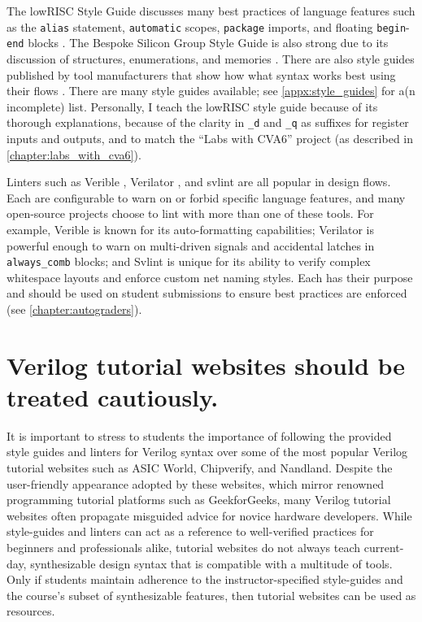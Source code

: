 The lowRISC Style Guide discusses many best practices of language features such as the \texttt{alias} statement, \texttt{automatic} scopes, \texttt{package} imports, and floating \texttt{begin}-\texttt{end} blocks \cite{lowRISCstyleguides}.
The Bespoke Silicon Group Style Guide is also strong due to its discussion of structures, enumerations, and memories \cite{BSGstyleguide}.
There are also style guides published by tool manufacturers that show how what syntax works best using their flows \cite{Xilinxstyleguide, Intelstyleguide, Latticestyleguide}.
There are many style guides available; see \autoref{appx:style_guides} for a(n incomplete) list.
Personally, I teach the lowRISC style guide because of its thorough explanations, because of the clarity in \texttt{_d} and \texttt{_q} as suffixes for register inputs and outputs, and to match the \enquote{Labs with CVA6} project (as described in \autoref{chapter:labs_with_cva6}).

Linters such as Verible \cite{veribleGitHub}, Verilator \cite{verilatorGitHub}, and svlint \cite{svlintGitHub} are all popular in design flows.
Each are configurable to warn on or forbid specific language features, and many open-source projects choose to lint with more than one of these tools.
For example, Verible is known for its auto-formatting capabilities; Verilator is powerful enough to warn on multi-driven signals and accidental latches in \texttt{always_comb} blocks; and Svlint is unique for its ability to verify complex whitespace layouts and enforce custom net naming styles.
Each has their purpose and should be used on student submissions to ensure best practices are enforced (see \autoref{chapter:autograders}).

\section{Verilog tutorial websites should be treated cautiously.}
\label{section:tutorial_websites}

It is important to stress to students the importance of following the provided style guides and linters for Verilog syntax over some of the most popular Verilog tutorial websites such as ASIC World, Chipverify, and Nandland.
Despite the user-friendly appearance adopted by these websites, which mirror renowned programming tutorial platforms such as GeekforGeeks, many Verilog tutorial websites often propagate misguided advice for novice hardware developers.
While style-guides and linters can act as a reference to well-verified practices for beginners and professionals alike, tutorial websites do not always teach current-day, synthesizable design syntax that is compatible with a multitude of tools.
Only if students maintain adherence to the instructor-specified style-guides and the course's subset of synthesizable features, then tutorial websites can be used as resources.

